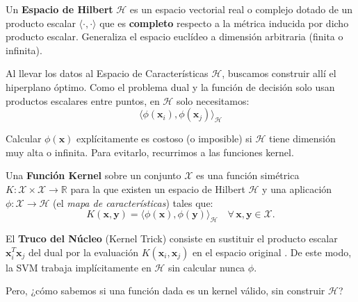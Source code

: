 \documentclass[12pt, a4paper]{article}
\begin{document}
\begin{tcolorbox}[colback=teal!5!white,colframe=teal!75!black,title=\textbf{Definición Formal: Espacio de Hilbert ($\mathcal{H}$)}]
Un \textbf{Espacio de Hilbert} $\mathcal{H}$ es un espacio vectorial real o complejo dotado de un producto escalar $\langle \cdot, \cdot \rangle$ que es \textbf{completo} respecto a la métrica inducida por dicho producto escalar. Generaliza el espacio euclídeo a dimensión arbitraria (finita o infinita).
\end{tcolorbox}

\noindent Al llevar los datos al Espacio de Características $\mathcal{H}$, buscamos construir allí el hiperplano óptimo. Como el problema dual y la función de decisión solo usan productos escalares entre puntos, en $\mathcal{H}$ solo necesitamos:
\[ \langle \phi(\mathbf{x}_i), \phi(\mathbf{x}_j) \rangle_{\mathcal{H}} \]

\noindent Calcular $\phi(\mathbf{x})$ explícitamente es costoso (o imposible) si $\mathcal{H}$ tiene dimensión muy alta o infinita. Para evitarlo, recurrimos a las funciones kernel.

\begin{tcolorbox}[colback=teal!5!white,colframe=teal!75!black,title=\textbf{Definición Formal: Función Kernel}]
Una \textbf{Función Kernel} sobre un conjunto $\mathcal{X}$ es una función simétrica $K: \mathcal{X} \times \mathcal{X} \to \mathbb{R}$ para la que existen un espacio de Hilbert $\mathcal{H}$ y una aplicación $\phi: \mathcal{X} \to \mathcal{H}$ (el \textit{mapa de características}) tales que:
\[ K(\mathbf{x}, \mathbf{y}) = \langle \phi(\mathbf{x}), \phi(\mathbf{y}) \rangle_{\mathcal{H}} \quad \forall\, \mathbf{x}, \mathbf{y} \in \mathcal{X}. \]
\end{tcolorbox}

\noindent El \textbf{Truco del Núcleo} (Kernel Trick) consiste en sustituir el producto escalar $\mathbf{x}_i^T\mathbf{x}_j$ del dual por la evaluación $K(\mathbf{x}_i, \mathbf{x}_j)$ en el espacio original \cite{bishop2006pattern}. De este modo, la SVM trabaja implícitamente en $\mathcal{H}$ sin calcular nunca $\phi$.

\noindent Pero, ¿cómo sabemos si una función dada es un kernel válido, sin construir $\mathcal{H}$?
\end{document}
